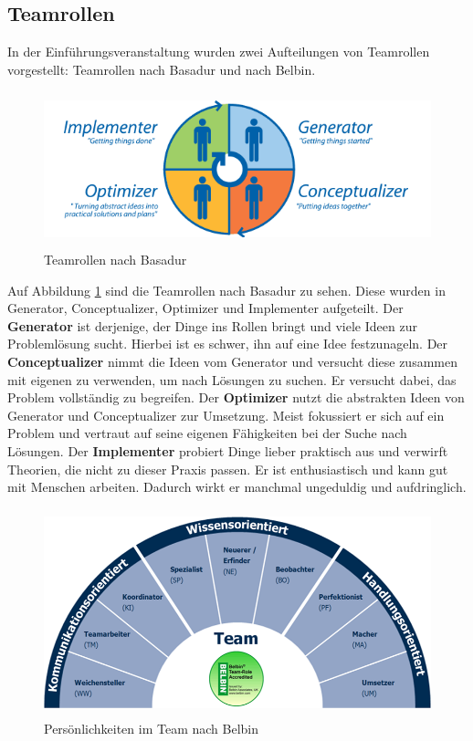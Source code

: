 \documentclass[a4paper,12pt,headsepline]{scrartcl}
\begin{document}
	\subsection{Teamrollen}
		In der Einführungsveranstaltung wurden zwei Aufteilungen von Teamrollen vorgestellt: Teamrollen nach Basadur und nach Belbin.
		\begin{figure} [H]
			\centering
			\includegraphics[height=4.5cm]{Images/Basadur.png}
			\caption{Teamrollen nach Basadur}
			\label{fig:Basadur}
		\end{figure}
		Auf Abbildung \ref{fig:Basadur} sind die Teamrollen nach Basadur zu sehen. Diese wurden in Generator, Conceptualizer, Optimizer und Implementer aufgeteilt. Der \textbf{Generator} ist derjenige, der Dinge ins Rollen bringt und viele Ideen zur Problemlösung sucht. Hierbei ist es schwer, ihn auf eine Idee festzunageln. Der \textbf{Conceptualizer} nimmt die Ideen vom Generator und versucht diese zusammen mit eigenen zu verwenden, um nach Lösungen zu suchen. Er versucht dabei, das Problem vollständig zu begreifen. Der \textbf{Optimizer} nutzt die abstrakten Ideen von Generator und Conceptualizer zur Umsetzung. Meist fokussiert er sich auf ein Problem und vertraut auf seine eigenen Fähigkeiten bei der Suche nach Lösungen. Der \textbf{Implementer} probiert Dinge lieber praktisch aus und verwirft Theorien, die nicht zu dieser Praxis passen. Er ist enthusiastisch und kann gut mit Menschen arbeiten. Dadurch wirkt er manchmal ungeduldig und aufdringlich.\\
		\begin{figure} [H]
			\centering
			\includegraphics[height=6cm, width=12cm]{Images/Belbin.png}
			\caption{Persönlichkeiten im Team nach Belbin}
			\label{fig:Belbin}
		\end{figure}
\end{document}
